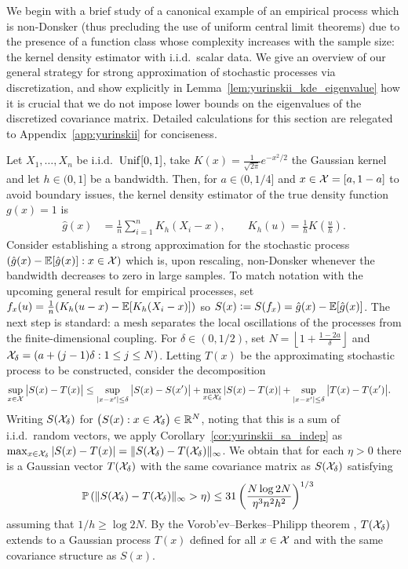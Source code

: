 We begin with a brief study of a canonical example of an empirical process
which is non-Donsker (thus precluding the use of uniform central limit
theorems) due to the presence of a function class whose complexity increases
with the sample size: the kernel density estimator with i.i.d.\ scalar data.
We give an overview of our general strategy for
strong approximation of stochastic processes
via discretization, and show explicitly in
Lemma~\ref{lem:yurinskii_kde_eigenvalue}
how it is crucial
that we do not impose lower bounds on the eigenvalues of the discretized
covariance matrix. Detailed calculations for this section are
relegated to Appendix~\ref{app:yurinskii} for conciseness.

Let $X_1, \ldots, X_n$ be i.i.d.\ $\operatorname{Unif}[0,1]$, take
$K(x) = \frac{1}{\sqrt{2 \pi}} e^{-x^2/2}$ the Gaussian kernel and let
$h \in (0,1]$ be a bandwidth. Then, for $a \in (0,1/4]$ and
$x \in \mathcal{X} = [a, 1-a]$ to avoid boundary issues, the kernel density estimator
of the true density function $g(x) = 1$ is
%
\begin{align*}
  \hat g(x)
  &=
  \frac{1}{n}
  \sum_{i=1}^{n}
  K_h( X_i - x),
  \qquad K_h(u) = \frac{1}{h} K\left( \frac{u}{h} \right).
\end{align*}
%
Consider establishing a strong approximation for the stochastic process
$(\hat g(x)-\mathbb{E} [ \hat g(x) ] : x\in\mathcal{X})$
which is, upon rescaling, non-Donsker whenever
the bandwidth decreases to zero in large samples.
To match notation with the upcoming
general result for empirical processes, set
$f_x(u) = \frac{1}{n} (K_h( u - x) - \mathbb{E}[K_h( X_i - x)])$
so $S(x) \vcentcolon= S(f_x) = \hat g(x)-\mathbb{E} [ \hat g(x) ]$.
The next step is standard: a
mesh separates the local oscillations of the processes from
the finite-dimensional coupling.
For $\delta \in (0,1/2)$, set
$N = \left\lfloor 1 + \frac{1 - 2a}{\delta} \right\rfloor$
and $\mathcal{X}_\delta = (a + (j-1)\delta : 1 \leq j \leq N)$.
Letting $T(x)$ be the approximating stochastic
process to be constructed, consider the decomposition
%
\begin{align*}
  \sup_{x \in \mathcal{X}}
  \big|S(x) - T(x)\big|
  &\leq
  \sup_{|x-x'| \leq \delta}
  \big|S(x) - S(x') \big|
  + \max_{x \in \mathcal{X}_\delta}
  |S(x) - T(x)|
  + \sup_{|x-x'| \leq \delta}
  \big|T(x) - T(x')\big|.
\end{align*}
%
Writing $S(\mathcal{X}_\delta)$ for
$\big(S(x) : x \in \mathcal{X}_\delta\big)\in \mathbb{R}^N$,
noting that this is a sum of i.i.d.\ random vectors, we apply
Corollary~\ref{cor:yurinskii_sa_indep} as
$\max_{x \in \mathcal{X}_\delta} |S(x) - T(x)|
= \| S(\mathcal{X}_\delta) - T(\mathcal{X}_\delta) \|_\infty$.
We obtain that for each $\eta > 0$ there is a Gaussian vector
$T(\mathcal{X}_\delta)$ with the same covariance matrix as $S(\mathcal{X}_\delta)$ satisfying
%
\begin{align*}
  \mathbb{P}\left(
    \|S(\mathcal{X}_\delta) - T(\mathcal{X}_\delta)\|_\infty > \eta
  \right)
  &\leq
  31 \left(
    \frac{N \log 2 N}{\eta^3 n^2 h^2}
  \right)^{1/3}
\end{align*}
%
assuming that $1/h \geq \log 2 N$.
By the Vorob'ev--Berkes--Philipp theorem
\citep[Theorem~1.1.10]{dudley1999uniform},
$T(\mathcal{X}_\delta)$ extends to a Gaussian process $T(x)$
defined for all $x \in \mathcal{X}$ and with the same covariance structure
as $S(x)$.

